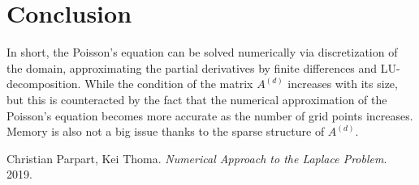\documentclass[refman]{article}
\theoremstyle{definition}
\begin{document}
\section{Conclusion}

In short, the Poisson's equation can be solved numerically via discretization of the domain, approximating the partial derivatives by finite differences and LU-decomposition. While the condition of the matrix \(A^{(d)}\) increases with its size, but this is counteracted by the fact that the numerical approximation of the Poisson's equation becomes more accurate as the number of grid points increases. Memory is also not a big issue thanks to the sparse structure of \(A^{(d)}\).

\begin{thebibliography}{9}
	Christian Parpart, Kei Thoma. 
	\textit{Numerical Approach to the Laplace Problem}. 
	2019.
\end{thebibliography}
\end{document}
